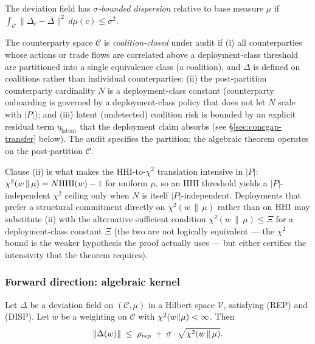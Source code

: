 \begin{definition}
\label{def:disp-companion}
The deviation field has \emph{$\sigma$-bounded dispersion}
relative to base measure $\mu$ if
$\int_\mathcal{C} \|\Delta_c - \bar\Delta\|^2 \,d\mu(c) \leq
\sigma^2$.
\end{definition}

\begin{definition}
\label{def:coal-companion}
The counterparty space $\mathcal{C}$ is \emph{coalition-closed}
under audit if (i) all counterparties whose actions or trade flows
are correlated above a deployment-class threshold are partitioned
into a single equivalence class (a coalition), and $\Delta$ is
defined on coalitions rather than individual counterparties;
(ii) the post-partition counterparty cardinality $N$ is a
deployment-class constant (counterparty onboarding is governed by
a deployment-class policy that does not let $N$ scale with $|P|$);
and (iii) latent (undetected) coalition risk is bounded by an
explicit residual term $\eta_\mathrm{latent}$ that the deployment
claim absorbs (see \S\ref{sec:concgap-transfer} below). The audit
specifies the partition; the algebraic theorem operates on the
post-partition $\mathcal{C}$.

Clause (ii) is what makes the HHI-to-$\chi^2$ translation
intensive in $|P|$: $\chi^2(w \,\|\, \mu) = N \mathrm{HHI}(w) - 1$ for
uniform $\mu$, so an HHI threshold yields a $|P|$-independent
$\chi^2$ ceiling only when $N$ is itself $|P|$-independent.
Deployments that prefer a structural commitment directly on
$\chi^2(w \,\|\, \mu)$ rather than on $\mathrm{HHI}$ may substitute (ii)
with the alternative sufficient condition $\chi^2(w \,\|\, \mu)
\leq \Xi$ for a deployment-class constant $\Xi$ (the two are not
logically equivalent --- the $\chi^2$ bound is the weaker
hypothesis the proof actually uses --- but either certifies the
intensivity that the theorem requires).
\end{definition}

\subsubsection{Forward direction: algebraic kernel}

\begin{lemma}
\label{lem:forward-companion}
Let $\Delta$ be a deviation field on $(\mathcal{C}, \mu)$ in a
Hilbert space $\mathcal{V}$, satisfying (REP) and (DISP). Let
$w$ be a weighting on $\mathcal{C}$ with $\chi^2(w \|\mu) <
\infty$. Then
\begin{equation}
\label{eq:forward-bound-companion}
  \|\Delta(w)\| \;\leq\; \rho_\mathrm{rep} \;+\;
  \sigma \cdot \sqrt{\chi^2(w \,\|\, \mu)}.
\end{equation}
\end{lemma}

